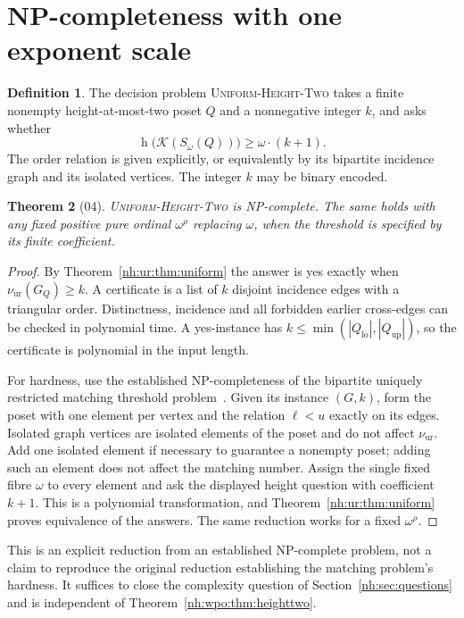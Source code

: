 \documentclass[11pt,a4paper]{article}
\newtheorem{theorem}{Theorem}[section]
\theoremstyle{definition}
\newtheorem{definition}[theorem]{Definition}
\theoremstyle{remark}
\newcommand{\K}{\mathcal K}
\newcommand{\hgt}{\operatorname{h}}
\newcommand{\Qlo}{Q_{\mathrm{lo}}}
\newcommand{\Qup}{Q_{\mathrm{up}}}
\newcommand{\nuur}{\nu_{\mathrm{ur}}}
\begin{document}
\section{NP-completeness with one exponent scale}\label{nh:ur:sec:complexity}
\setcounter{equation}{0}

\begin{definition}\label{nh:ur:def:problem}
The decision problem \textsc{Uniform-Height-Two} takes a finite nonempty
height-at-most-two poset $Q$ and a nonnegative integer $k$, and asks whether
\[
 \hgt\bigl(\K(S_\omega(Q))\bigr)\ge\omega\cdot(k+1).
\]
The order relation is given explicitly, or equivalently by its bipartite
incidence graph and its isolated vertices. The integer $k$ may be binary
encoded.
\end{definition}

\begin{theorem}[04]\label{nh:ur:thm:np}
\textsc{Uniform-Height-Two} is NP-complete. The same holds with any fixed
positive pure ordinal $\omega^\rho$ replacing $\omega$, when the threshold is
specified by its finite coefficient.
\end{theorem}
\begin{proof}
By Theorem~\ref{nh:ur:thm:uniform} the answer is yes exactly when
$\nuur(G_Q)\ge k$. A certificate is a list of $k$ disjoint incidence edges
with a triangular order. Distinctness, incidence and all forbidden earlier
cross-edges can be checked in polynomial time. A yes-instance has
$k\le\min(|\Qlo|,|\Qup|)$, so the certificate is polynomial in the input
length.

For hardness, use the established NP-completeness of the bipartite uniquely
restricted matching threshold problem~\cite{GHL2001}. Given its instance
$(G,k)$, form the poset with one element per vertex and the relation
$\ell<u$ exactly on its edges. Isolated graph vertices are isolated elements
of the poset and do not affect $\nuur$. Add one isolated element if necessary
to guarantee a nonempty poset; adding such an element does not affect the
matching number. Assign the single fixed fibre $\omega$ to every element and
ask the displayed height question with coefficient $k+1$. This is a
polynomial transformation, and Theorem~\ref{nh:ur:thm:uniform} proves
equivalence of the answers. The same reduction works for a fixed
$\omega^\rho$.
\end{proof}

This is an explicit reduction from an established NP-complete problem, not a
claim to reproduce the original reduction establishing the matching problem's
hardness. It suffices to close the complexity question of
Section~\ref{nh:sec:questions} and is independent of
Theorem~\ref{nh:wpo:thm:heighttwo}.
\end{document}
